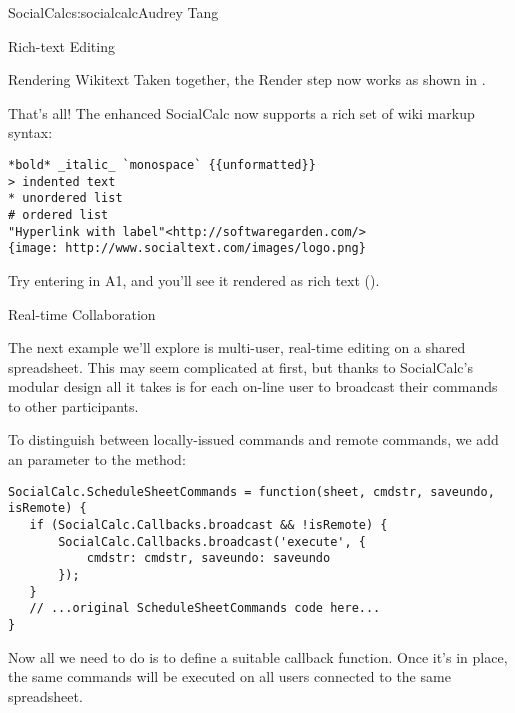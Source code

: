 \begin{aosachapter}{SocialCalc}{s:socialcalc}{Audrey Tang}
\begin{aosasect1}{Rich-text Editing}
\begin{aosasect2}{Rendering Wikitext}
\noindent Taken together, the Render step now works as shown in
.


That's all!  The enhanced SocialCalc now supports a rich set of wiki
markup syntax:

\begin{verbatim}
*bold* _italic_ `monospace` {{unformatted}}
> indented text
* unordered list
# ordered list
"Hyperlink with label"<http://softwaregarden.com/>
{image: http://www.socialtext.com/images/logo.png}
\end{verbatim}

\noindent Try entering  in A1, and you'll
see it rendered as rich text ().


\end{aosasect2}

\end{aosasect1}


\begin{aosasect1}{Real-time Collaboration}

The next example we'll explore is multi-user, real-time editing on a
shared spreadsheet.  This may seem complicated at first, but thanks to
SocialCalc's modular design all it takes is for each on-line user to
broadcast their commands to other participants.

To distinguish between locally-issued commands and remote commands, we
add an  parameter to the 
method:

\begin{verbatim}
SocialCalc.ScheduleSheetCommands = function(sheet, cmdstr, saveundo, isRemote) {
   if (SocialCalc.Callbacks.broadcast && !isRemote) {
       SocialCalc.Callbacks.broadcast('execute', {
           cmdstr: cmdstr, saveundo: saveundo
       });
   }
   // ...original ScheduleSheetCommands code here...
}
\end{verbatim}

\noindent Now all we need to do is to define a suitable
 callback function.  Once it's
in place, the same commands will be executed on all users connected
to the same spreadsheet.


\end{aosasect1}
\end{aosachapter}
